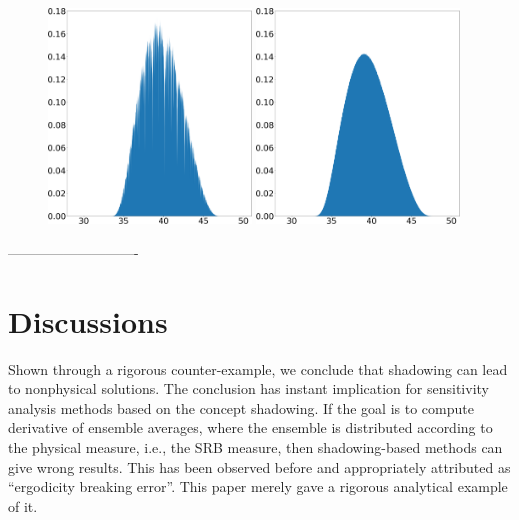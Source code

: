 \begin{figure}[H]
    \\
    \includegraphics[width=0.48\textwidth]{figure/lorenz_shadow_density_lorenz_zmax_10_28_3.33.json.png}
    \hspace{0.005\textwidth}
    \includegraphics[width=0.48\textwidth]{figure/baseline_density_lorenz_zmax_10_28_3.33.json.png}
    \caption{
    }
    \label{fig:lorenz_params_scaled}
\end{figure}
----------------------------


\section{Discussions}
Shown through a rigorous counter-example, we conclude that shadowing can lead
to nonphysical solutions.  The conclusion has instant implication for
sensitivity analysis methods based on the concept shadowing.
If the goal is to compute derivative of ensemble averages, where the ensemble
is distributed according to the physical measure, i.e., the SRB measure,
then shadowing-based methods can give wrong results.  This has been observed
before and appropriately attributed as ``ergodicity breaking error''.
This paper merely gave a rigorous analytical example of it.

